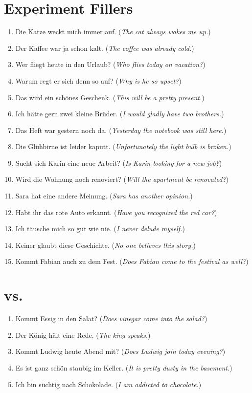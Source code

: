 \section*{Experiment Fillers}
\begin{enumerate}[resume]
	\item Die Katze weckt mich immer auf. (\textit{The cat always wakes me up.})
	\item Der Kaffee war ja schon kalt. (\textit{The coffee was already cold.})
	\item Wer fliegt heute in den Urlaub? (\textit{Who flies today on vacation?})
	\item Warum regt er sich denn so auf? (\textit{Why is he so upset?})
	\item Das wird ein schönes Geschenk. (\textit{This will be a pretty present.})
	\item Ich hätte gern zwei kleine Brüder. (\textit{I would gladly have two brothers.})
	\item Das Heft war gestern noch da. (\textit{Yesterday the notebook was still here.})
	\item Die Glühbirne ist leider kaputt. (\textit{Unfortunately the light bulb is broken.})
	\item Sucht sich Karin eine neue Arbeit? (\textit{Is Karin looking for a new job?})
	\item Wird die Wohnung noch renoviert? (\textit{Will the apartment be renovated?})
	\item Sara hat eine andere Meinung. (\textit{Sara has another opinion.})
	\item Habt ihr das rote Auto erkannt. (\textit{Have you recognized the red car?})
	\item Ich täusche mich so gut wie nie. (\textit{I never delude myself.})
	\item Keiner glaubt diese Geschichte. (\textit{No one believes this story.})
	\item Kommt Fabian auch zu dem Fest. (\textit{Does Fabian come to the festival as well?})
\end{enumerate}

\section*{\textipa{[\c{c}]} vs.\ \textipa{[k]}}
\begin{enumerate}[resume]
	\item Kommt Essig in den Salat? (\textit{Does vinegar come into the salad?})
	\item Der König hält eine Rede. (\textit{The king speaks.})
	\item Kommt Ludwig heute Abend mit? (\textit{Does Ludwig join today evening?})
	\item Es ist ganz schön staubig im Keller. (\textit{It is pretty dusty in the basement.})
	\item Ich bin süchtig nach Schokolade. (\textit{I am addicted to chocolate.})
\end{enumerate}

